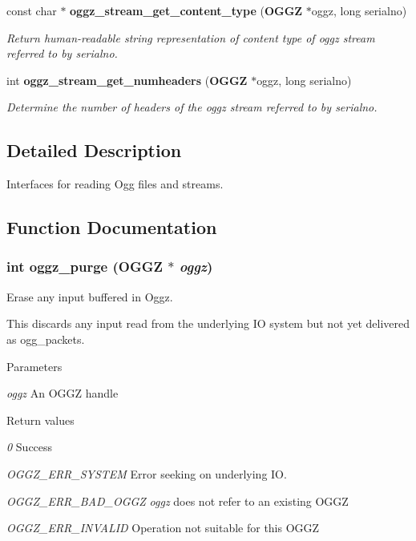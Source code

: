 \begin{DoxyCompactItemize}
const char $\ast$ {\bf oggz\_\-stream\_\-get\_\-content\_\-type} ({\bf OGGZ} $\ast$oggz, long serialno)
\begin{DoxyCompactList}\small\item\em Return human-\/readable string representation of content type of oggz stream referred to by {\itshape serialno\/}. \item\end{DoxyCompactList}\item 
int {\bf oggz\_\-stream\_\-get\_\-numheaders} ({\bf OGGZ} $\ast$oggz, long serialno)
\begin{DoxyCompactList}\small\item\em Determine the number of headers of the oggz stream referred to by {\itshape serialno\/}. \item\end{DoxyCompactList}\end{DoxyCompactItemize}


\subsection{Detailed Description}
Interfaces for reading Ogg files and streams. 

\subsection{Function Documentation}
\subsubsection[{oggz\_\-purge}]{\setlength{\rightskip}{0pt plus 5cm}int oggz\_\-purge ({\bf OGGZ} $\ast$ {\em oggz})}\label{oggz__read_8h_adf606e6641a7d59eff2030b7b9ce51f8}


Erase any input buffered in Oggz. 

This discards any input read from the underlying IO system but not yet delivered as ogg\_\-packets.


\begin{DoxyParams}{Parameters}
\item[{\em oggz}]An OGGZ handle \end{DoxyParams}

\begin{DoxyRetVals}{Return values}
\item[{\em 0}]Success \item[{\em OGGZ\_\-ERR\_\-SYSTEM}]Error seeking on underlying IO. \item[{\em OGGZ\_\-ERR\_\-BAD\_\-OGGZ}]{\itshape oggz\/} does not refer to an existing OGGZ \item[{\em OGGZ\_\-ERR\_\-INVALID}]Operation not suitable for this OGGZ \end{DoxyRetVals}
